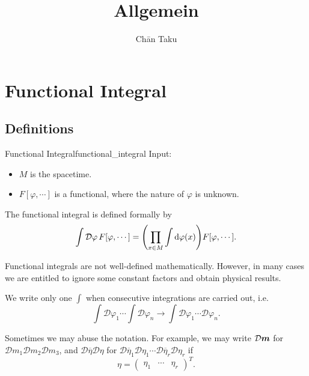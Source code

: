 \documentclass{article}
\title{Allgemein}
\author{Ch\=an Taku}
\begin{document}
\maketitle

\section{Functional Integral}

\subsection{Definitions}

\begin{definition}{Functional Integral}{functional_integral}
    Input:
    \begin{itemize}[nosep]
        \item $M$ is the spacetime.
        \item $F[\varphi,\cdots]$ is a functional, where the nature of $\varphi$ is unknown.
    \end{itemize}
    The functional integral is defined formally by
    \begin{align*}
        \int \mathcal{D}{\varphi}\, F[\varphi,\cdots] = \qty(\prod_{x\in M}\int \dd{\varphi(x)}) F[\varphi,\cdots].
    \end{align*}
\end{definition}

Functional integrals are not well-defined mathematically.
However, in many cases we are entitled to ignore some constant factors and obtain physical results.

We write only one $\int$ when consecutive integrations are carried out, i.e.
\[ \int \mathcal{D}\varphi_1 \cdots \int \mathcal{D}\varphi_n \rightarrow \int \mathcal{D}\varphi_1 \cdots \mathcal{D}\varphi_n. \]

Sometimes we may abuse the notation.
For example, we may write $\mathcal{D}\vb*{m}$ for $\mathcal{D}m_1\mathcal{D}m_2\mathcal{D}m_3$,
and $\mathcal{D}{\overline{\eta}} \mathcal{D}{\eta}$ for $\mathcal{D}\overline{\eta}_1 \mathcal{D}{\eta}_1 \cdots \mathcal{D}\overline{\eta}_r \mathcal{D}{\eta}_r$ if
\[ \eta = \begin{pmatrix} \eta_1 & \cdots & \eta_r \end{pmatrix}^T. \]
\end{document}
